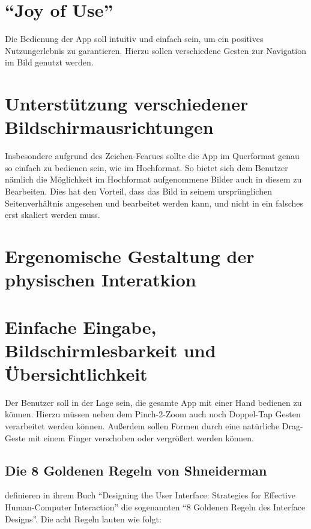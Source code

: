 \section{``Joy of Use''}
Die Bedienung der App soll intuitiv und einfach sein, um ein positives Nutzungerlebnis zu garantieren.
Hierzu sollen verschiedene Gesten zur Navigation im Bild genutzt werden.

\section{Unterstützung verschiedener Bildschirmausrichtungen}
Insbesondere aufgrund des Zeichen-Fearues sollte die App im Querformat genau so einfach zu bedienen sein, wie im Hochformat.
So bietet sich dem Benutzer nämlich die Möglichkeit im Hochformat aufgenommene Bilder auch in diesem zu Bearbeiten.
Dies hat den Vorteil, dass das Bild in seinem ursprünglichen Seitenverhältnis angesehen und bearbeitet werden kann, und nicht in ein falsches erst skaliert werden muss.

\section{Ergenomische Gestaltung der physischen Interatkion}

\section{Einfache Eingabe, Bildschirmlesbarkeit und Übersichtlichkeit}
Der Benutzer soll in der Lage sein, die gesamte App mit einer Hand bedienen zu können.
Hierzu müssen neben dem Pinch-2-Zoom auch noch Doppel-Tap Gesten verarbeitet werden können.
Außerdem sollen Formen durch eine natürliche Drag-Geste mit einem Finger verschoben oder vergrößert werden können.

\subsection{Die 8 Goldenen Regeln von Shneiderman}

\citeauthor{Shneiderman04} definieren in ihrem Buch ``Designing the User Interface: Strategies for Effective Human-Computer Interaction'' die sogenannten ``8 Goldenen Regeln des Interface Designs''.  Die acht Regeln lauten wie folgt:

